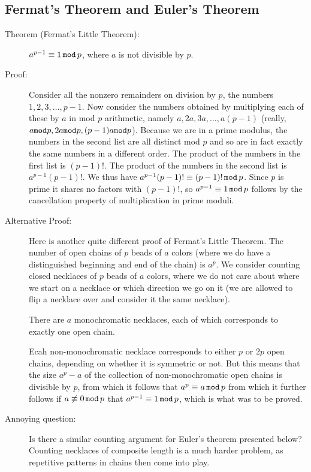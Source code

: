 \documentclass[12pt]{article}
\begin{document}
\subsection{Fermat's Theorem and Euler's Theorem}

\begin{description}

\item[Theorem (Fermat's Little Theorem):]  $a^{p-1} \equiv 1\,{\tt mod}\,p$, where $a$ is not divisible by $p$.

\item[ Proof:] Consider all the nonzero remainders on division by $p$, the numbers
$1,2,3,\ldots,p-1$.   Now consider the numbers obtained by multiplying each of these by $a$ in mod $p$ arithmetic,
namely $a,2a,3a,\ldots,a(p-1)$ (really, $a {\tt mod}p, 2a{\tt mod}p, (p-1)a{\tt mod}p$).   Because we are in a prime modulus, the numbers in the second list are all distinct
mod $p$ and so are in fact exactly the same numbers in a different order.   The product of the numbers in the first list is $(p-1)!$.   The product of the numbers in the second list is $a^{p-1}(p-1)!$.  We thus have
$a^{p-1}(p-1)! \equiv (p-1)!\,{\tt mod}\,p$.   Since $p$ is prime it shares no factors with $(p-1)!$,
so $a^{p-1} \equiv 1\,{\tt mod}\,p$ follows by the cancellation property of multiplication in prime moduli.

\item[Alternative Proof:]  Here is another quite different proof of Fermat's Little Theorem.   The number of open chains of $p$ beads of $a$ colors (where we do have a distinguished beginning and end of the chain)
is $a^p$.   We consider counting closed necklaces of $p$ beads of $a$ colors, where we do not care about where we start on a necklace or which direction we go on it (we are allowed to flip a necklace over and consider it the same necklace).

There are $a$ monochromatic necklaces, each of which corresponds to exactly one open chain.

Ecah non-monochromatic necklace corresponds to either $p$ or $2p$ open chains, depending on whether it is symmetric or not.   But this means that the size $a^p-a$ of the collection of non-monochromatic open chains is divisible
by $p$, from which it follows that $a^p \equiv a \,{\tt mod}\,p$ from which it further follows if $a \not\equiv 0\,{\tt mod}\,p$ that $a^{p-1}\equiv 1\,{\tt mod}\,p$, which is what was to be proved.


\item[Annoying question:]  Is there a similar counting argument for Euler's theorem presented below?   Counting necklaces of composite length is a much harder problem, as repetitive patterns in chains then come into play.


\end{description}
\end{document}
